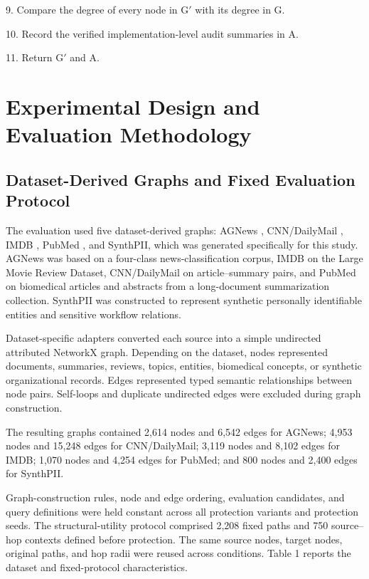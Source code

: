 \documentclass[preprint,12pt]{elsarticle}
\begin{document}
9. Compare the degree of every node in G$'$ with its degree in G.

10. Record the verified implementation-level audit summaries in A.

11. Return G$'$ and A.

\section{Experimental Design and Evaluation Methodology}
\subsection{Dataset-Derived Graphs and Fixed Evaluation Protocol}
The evaluation used five dataset-derived graphs: AGNews \cite{ref44_zhang_2015}, CNN/DailyMail \cite{ref28_nallapati_2016}, IMDB \cite{ref23_maas_2011}, PubMed \cite{ref06_cohan_2018}, and SynthPII, which was generated specifically for this study. AGNews was based on a four-class news-classification corpus, IMDB on the Large Movie Review Dataset, CNN/DailyMail on article--summary pairs, and PubMed on biomedical articles and abstracts from a long-document summarization collection. SynthPII was constructed to represent synthetic personally identifiable entities and sensitive workflow relations.

Dataset-specific adapters converted each source into a simple undirected attributed NetworkX graph. Depending on the dataset, nodes represented documents, summaries, reviews, topics, entities, biomedical concepts, or synthetic organizational records. Edges represented typed semantic relationships between node pairs. Self-loops and duplicate undirected edges were excluded during graph construction.

The resulting graphs contained 2,614 nodes and 6,542 edges for AGNews; 4,953 nodes and 15,248 edges for CNN/DailyMail; 3,119 nodes and 8,102 edges for IMDB; 1,070 nodes and 4,254 edges for PubMed; and 800 nodes and 2,400 edges for SynthPII.

Graph-construction rules, node and edge ordering, evaluation candidates, and query definitions were held constant across all protection variants and protection seeds. The structural-utility protocol comprised 2,208 fixed paths and 750 source--hop contexts defined before protection. The same source nodes, target nodes, original paths, and hop radii were reused across conditions. Table 1 reports the dataset and fixed-protocol characteristics.
\end{document}
